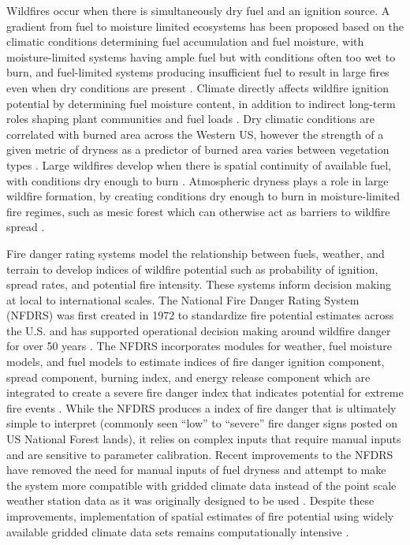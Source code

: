 \documentclass[11p]{article}
\begin{document}
Wildfires occur when there is simultaneously dry fuel and an ignition source. A gradient from fuel to moisture limited ecosystems has been proposed based on the climatic conditions determining fuel accumulation and fuel moisture, with moisture-limited systems having ample fuel but with conditions often too wet to burn, and fuel-limited systems producing insufficient fuel to result in large fires even when dry conditions are present \citep{meynEnvironmentalDriversLarge2007}. Climate directly affects wildfire ignition potential by determining fuel moisture content, in addition to indirect long-term roles shaping plant communities and fuel loads \citep{littellReviewRelationshipsDrought2016}. Dry climatic conditions are correlated with burned area across the Western US, however the strength of a given metric of dryness as a predictor of burned area varies between vegetation types \citep{littellClimateWildfireArea2009}. Large wildfires develop when there is spatial continuity of available fuel, with conditions dry enough to burn %
\citep{millerConnectivityForestFuels2000}. Atmospheric dryness plays a role in large wildfire formation, by creating conditions dry enough to burn in moisture-limited fire regimes, such as mesic forest which can otherwise act as barriers to wildfire spread \citep{cawsonAtmosphericDrynessRemoves2024}.

Fire danger rating systems model the relationship between fuels, weather, and terrain to develop indices of wildfire potential such as probability of ignition, spread rates, and potential fire intensity. These systems inform decision making at local to international scales. The National Fire Danger Rating System (NFDRS) was first created in 1972 to standardize fire potential estimates across the U.S. and has supported operational decision making around wildfire danger for over 50 years \citep{jollyModernizingUSNational2024,zacharakisEnvironmentalForestFire2023}. The NFDRS incorporates modules for weather, fuel moisture models, and fuel models to estimate indices of fire danger ignition component, spread component, burning index, and energy release component which are integrated to create a severe fire danger index that indicates potential for extreme fire events \citep{jollyModernizingUSNational2024,jollySevereFireDanger2019}. While the NFDRS produces a index of fire danger that is ultimately simple to interpret (commonly seen ``low'' to ``severe'' fire danger signs posted on US National Forest lands), it relies on complex inputs that require manual inputs and are sensitive to parameter calibration. Recent improvements to the NFDRS have removed the need for manual inputs of fuel dryness and attempt to make the system more compatible with gridded climate data instead of the point scale weather station data as it was originally designed to be used \citep{jollyModernizingUSNational2024}. Despite these improvements, implementation of spatial estimates of fire potential using widely available gridded climate data sets remains computationally intensive \citep{farguellFastSpatialNFDRS2025a}.
\end{document}

